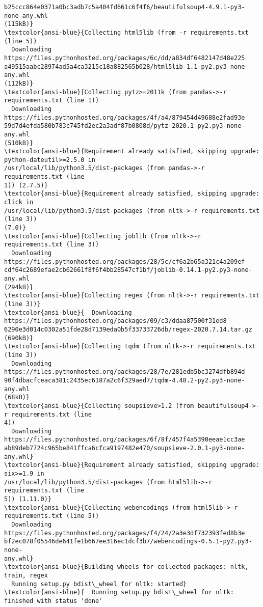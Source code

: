 \documentclass[11pt]{article}
\begin{document}
\begin{Verbatim}[commandchars=\\\{\}]
b25ccc864e0371a0bc3adb7c5a404fd661c6f4f6/beautifulsoup4-4.9.1-py3-none-any.whl
(115kB)}
\textcolor{ansi-blue}{Collecting html5lib (from -r requirements.txt (line 5))
  Downloading https://files.pythonhosted.org/packages/6c/dd/a834df6482147d48e225
a49515aabc28974ad5a4ca3215c18a882565b028/html5lib-1.1-py2.py3-none-any.whl
(112kB)}
\textcolor{ansi-blue}{Collecting pytz>=2011k (from pandas->-r requirements.txt (line 1))
  Downloading https://files.pythonhosted.org/packages/4f/a4/879454d49688e2fad93e
59d7d4efda580b783c745fd2ec2a3adf87b0808d/pytz-2020.1-py2.py3-none-any.whl
(510kB)}
\textcolor{ansi-blue}{Requirement already satisfied, skipping upgrade: python-dateutil>=2.5.0 in
/usr/local/lib/python3.5/dist-packages (from pandas->-r requirements.txt (line
1)) (2.7.5)}
\textcolor{ansi-blue}{Requirement already satisfied, skipping upgrade: click in
/usr/local/lib/python3.5/dist-packages (from nltk->-r requirements.txt (line 3))
(7.0)}
\textcolor{ansi-blue}{Collecting joblib (from nltk->-r requirements.txt (line 3))
  Downloading https://files.pythonhosted.org/packages/28/5c/cf6a2b65a321c4a209ef
cdf64c2689efae2cb62661f8f6f4bb28547cf1bf/joblib-0.14.1-py2.py3-none-any.whl
(294kB)}
\textcolor{ansi-blue}{Collecting regex (from nltk->-r requirements.txt (line 3))}
\textcolor{ansi-blue}{  Downloading https://files.pythonhosted.org/packages/09/c3/ddaa87500f31ed8
6290e3d014c0302a51fde28d7139eda0b5f33733726db/regex-2020.7.14.tar.gz (690kB)}
\textcolor{ansi-blue}{Collecting tqdm (from nltk->-r requirements.txt (line 3))
  Downloading https://files.pythonhosted.org/packages/28/7e/281edb5bc3274dfb894d
90f4dbacfceaca381c2435ec6187a2c6f329aed7/tqdm-4.48.2-py2.py3-none-any.whl
(68kB)}
\textcolor{ansi-blue}{Collecting soupsieve>1.2 (from beautifulsoup4->-r requirements.txt (line
4))
  Downloading https://files.pythonhosted.org/packages/6f/8f/457f4a5390eeae1cc3ae
ab89deb7724c965be841ffca6cfca9197482e470/soupsieve-2.0.1-py3-none-any.whl}
\textcolor{ansi-blue}{Requirement already satisfied, skipping upgrade: six>=1.9 in
/usr/local/lib/python3.5/dist-packages (from html5lib->-r requirements.txt (line
5)) (1.11.0)}
\textcolor{ansi-blue}{Collecting webencodings (from html5lib->-r requirements.txt (line 5))
  Downloading https://files.pythonhosted.org/packages/f4/24/2a3e3df732393fed8b3e
bf2ec078f05546de641fe1b667ee316ec1dcf3b7/webencodings-0.5.1-py2.py3-none-
any.whl}
\textcolor{ansi-blue}{Building wheels for collected packages: nltk, train, regex
  Running setup.py bdist\_wheel for nltk: started}
\textcolor{ansi-blue}{  Running setup.py bdist\_wheel for nltk: finished with status 'done'

\end{Verbatim}
\end{document}
